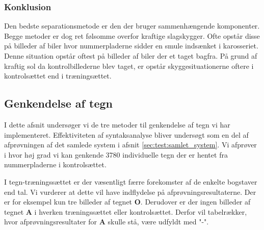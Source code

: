 \subsubsection{Konklusion}
Den bedste separationsmetode er den der bruger sammenhængende komponenter. Begge metoder er dog ret følsomme overfor kraftige slagskygger. Ofte opstår disse på billeder af biler hvor nummerpladerne sidder en smule indsænket i karosseriet. Denne situation opstår oftest på billeder af biler der et taget bagfra. På grund af kraftig sol da kontrolbillederne blev taget, er opstår skyggesituationerne oftere i kontrolsættet end i træningsættet. 

\subsection{Genkendelse af tegn}
I dette afsnit undersøger vi de tre metoder til genkendelse af tegn vi har implementeret.
Effektiviteten af syntaksanalyse bliver undersøgt som en del af afprøvningen af det samlede system i afsnit \vref{sec:test:samlet_system}. Vi afprøver i hvor høj grad vi kan genkende 3780 individuelle tegn der er hentet fra nummerpladerne i kontrolsættet.

I tegn-træningssættet er der væsentligt færre forekomster af de enkelte bogstaver end tal. Vi vurderer at dette vil have indflydelse på afprøvningsresultaterne. Der er for eksempel kun tre billeder af tegnet \textbf{O}. Derudover er der ingen billeder af tegnet \textbf{A} i hverken træningssættet eller kontrolsættet. Derfor vil tabelrækker, hvor afprøvningsresultater for \textbf{A} skulle stå, være udfyldt med "-".

